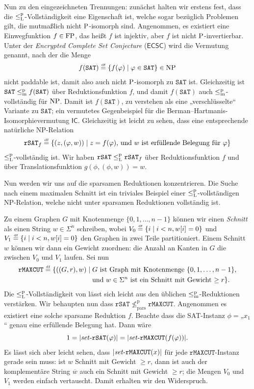 Nun zu den eingezeichneten Trennungen: zunächst halten wir erstens fest, dass die $\leqlp$-Vollständigkeit eine Eigenschaft ist, welche sogar bezüglich Problemen gilt, die mutmaßlich nicht $\P$-isomorph sind.
Angenommen, es existiert eine Einwegfunktion $f\in\FP$, das heißt $f$ ist injektiv, aber $f$ ist nicht $\P$-invertierbar.
Unter der \emph{Encrypted Complete Set Conjecture} ($\mathsf{ECSC}$) wird die Vermutung genannt, nach der die Menge
\[ f(\mathtt{SAT}) \defeq \{ f(\phi) \mid \phi\in\mathtt{SAT} \}\in\NP \]
nicht paddable ist, damit also auch nicht $\P$-isomorph zu $\mathtt{SAT}$ ist.
Gleichzeitig ist $\mathtt{SAT}\leqmp f(\mathtt{SAT})$ über Reduktionsfunktion $f$, und damit $f(\mathtt{SAT})$ auch $\leqmp$-vollständig für $\NP$.
Damit ist $f(\mathtt{SAT})$, zu verstehen als eine „verschlüsselte“ Variante zu $\mathtt{SAT}$; ein vermutetes Gegenbeispiel für die Berman–Hartmanis-Isomorphievermutung $\mathsf{IC}$.
Gleichzeitig ist leicht zu sehen, dass eine entsprechende natürliche NP-Relation
\[ \mathtt{rSAT}_f \defeq \{ (z, (\phi, w)) \mid \text{$z=f(\phi)$, und $w$ ist erfüllende Belegung für $\phi$} \} \]
$\leqlp$-vollständig ist. Wir haben $\mathtt{rSAT}\leqlp\mathtt{rSAT}_f$ über Reduktionsfunktion $f$ und über Translationsfunktion $g(\phi, (\phi, w))= w$.




Nun werden wir uns auf die sparsamen Reduktionen konzentrieren. Die Suche nach einem maximalen Schnitt ist ein triviales Beispiel einer $\leqlp$-vollständigen NP-Relation, welche nicht unter sparsamen Reduktionen vollständig ist.

Zu einem Graphen $G$ mit Knotenmenge $\{0,1,\dots, n-1\}$ können wir einen \emph{Schnitt} als einen String $w\in\Sigma^n$ schreiben, wobei $V_0 \defeq \{ i \mid i<n, w[i]=0\}$ und $V_1 \defeq \{ i \mid i<n, w[i]=0\}$ den Graphen in zwei Teile partitioniert. Einem Schnitt $w$ können wir dann ein Gewicht zuordnen: die Anzahl an Kanten in $G$ die zwischen $V_0$ und $V_1$ laufen.
Sei nun
\[ \begin{split} \mathtt{rMAXCUT} \defeq \{ ((G, r), w) \mid {}&\text{$G$ ist Graph mit Knotenmenge $\{0,1,\dots,n-1\}$,} \\ &\text{und $w\in\Sigma^n$ ist ein Schnitt mit Gewicht $\geq r$} \}.\end{split} \]
 Die $\leqlp$-Vollständigkeit von lässt sich leicht aus den üblichen $\leqmp$-Reduktionen verstärken.
Wir behaupten nun dass $\mathtt{rSAT} \not\leq_\mathrm{pars}^\mathrm p \mathtt{rMAXCUT}$. Angenommen es existiert eine solche sparsame Reduktion $f$. Beachte dass die SAT-Instanz $\phi={}$„$x_1$“ genau eine erfüllende Belegung hat. Dann wäre
\[ 1=|\fset{}\mathtt{rSAT}(\phi)|=|\fset{}\mathtt{rMAXCUT}(f(\phi))|. \]
Es lässt sich aber leicht sehen, dass $|\fset{}\mathtt{rMAXCUT}(x)|$ für jede $\mathtt{rMAXCUT}$-Instanz gerade sein muss: ist $w$ Schnitt mit Gewicht $\geq r$, dann ist auch der komplementäre String $\overline{w}$ auch ein Schnitt mit Gewicht $\geq r$; die Mengen $V_0$ und $V_1$ werden einfach vertauscht.
Damit erhalten wir den Widerspruch.

